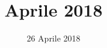 


\title{ Aprile 2018}
\author{\GroupName}

\date{26 Aprile 2018}



\makeFrontPage

    \frenchspacing

    


